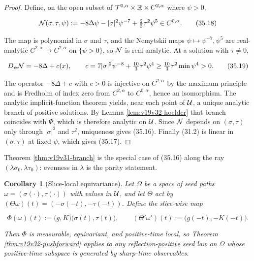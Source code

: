 \documentclass[11pt]{article}
\newtheorem{corollary}[theorem]{Corollary}
\theoremstyle{remark}
\begin{document}
\begin{proof}
Define, on the open subset of
\({\cal T}^{0,\alpha}\times\mathbb R\times C^{2,\alpha}\) where
\(\psi>0\),

\[
 {\cal N}(\sigma,\tau,\psi)
 :=-8\Delta\psi-|\sigma|^2\psi^{-7}+\tfrac23\tau^2\psi^5
 \in C^{0,\alpha}.                                                \tag{35.18}
\]

The map is polynomial in \(\sigma\) and \(\tau\), and the Nemytskii maps
\(\psi\mapsto\psi^{-7},\psi^5\) are real-analytic
\(C^{2,\alpha}\to C^{2,\alpha}\) on \(\{\psi>0\}\), so \({\cal N}\) is
real-analytic.  At a solution with \(\tau\neq0\),

\[
 D_\psi{\cal N}=-8\Delta+c(x),\qquad
 c=7|\sigma|^2\psi^{-8}+\tfrac{10}3\tau^2\psi^4
 \geq\tfrac{10}3\tau^2\min\psi^4>0.                              \tag{35.19}
\]

The operator \(-8\Delta+c\) with \(c>0\) is injective on \(C^{2,\alpha}\)
by the maximum principle and is Fredholm of index zero from
\(C^{2,\alpha}\) to \(C^{0,\alpha}\), hence an isomorphism.  The analytic
implicit-function theorem yields, near each point of \({\cal U}\), a
unique analytic branch of positive solutions.  By Lemma
\ref{lem:v19v32-hoelder} that branch coincides with \(\Psi\), which is
therefore analytic on \({\cal U}\).  Since \({\cal N}\) depends on
\((\sigma,\tau)\) only through \(|\sigma|^2\) and \(\tau^2\), uniqueness
gives (35.16).  Finally (31.2) is linear in \((\sigma,\tau)\) at fixed
\(\psi\), which gives (35.17).
\end{proof}

Theorem \ref{thm:v19v31-branch} is the special case of (35.16) along the
ray \((\lambda\sigma_0,\lambda\tau_0)\): evenness in \(\lambda\) is the
parity statement.

\begin{corollary}[Slice-local equivariance]
\label{cor:v19v32-slicewise}
Let \(\Omega\) be a space of seed paths
\(\omega=(\sigma(\cdot),\tau(\cdot))\) with values in \({\cal U}\), and
let \(\Theta\) act by
\((\Theta\omega)(t)=(-\sigma(-t),-\tau(-t))\).  Define the slice-wise
map

\[
 \Phi(\omega)(t):=\bigl(g,K\bigr)\bigl(\sigma(t),\tau(t)\bigr),
 \qquad
 (\Theta'\omega')(t):=\bigl(g(-t),-K(-t)\bigr).                   \tag{35.20}
\]

Then \(\Phi\) is measurable, equivariant, and positive-time local, so
Theorem \ref{thm:v19v32-pushforward} applies to any reflection-positive
seed law on \(\Omega\) whose positive-time subspace is generated by
sharp-time observables.
\end{corollary}
\end{document}
